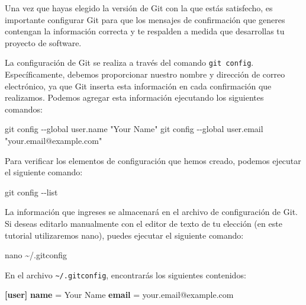 \documentclass[
  letterpaper,
  DIV=11,
  numbers=noendperiod]{scrartcl}
\newenvironment{Shaded}{}{}
\newcommand{\AttributeTok}[1]{\textcolor[rgb]{0.84,0.23,0.29}{#1}}
\newcommand{\ExtensionTok}[1]{\textcolor[rgb]{0.84,0.23,0.29}{\textbf{#1}}}
\newcommand{\FunctionTok}[1]{\textcolor[rgb]{0.44,0.26,0.76}{#1}}
\newcommand{\NormalTok}[1]{\textcolor[rgb]{0.14,0.16,0.18}{#1}}
\newcommand{\StringTok}[1]{\textcolor[rgb]{0.01,0.18,0.38}{#1}}
\begin{document}
Una vez que hayas elegido la versión de Git con la que estás satisfecho,
es importante configurar Git para que los mensajes de confirmación que
generes contengan la información correcta y te respalden a medida que
desarrollas tu proyecto de software.

La configuración de Git se realiza a través del comando
\texttt{git\ config}. Específicamente, debemos proporcionar nuestro
nombre y dirección de correo electrónico, ya que Git inserta esta
información en cada confirmación que realizamos. Podemos agregar esta
información ejecutando los siguientes comandos:

\begin{Shaded}
\begin{Highlighting}[]
\FunctionTok{git}\NormalTok{ config }\AttributeTok{{-}{-}global}\NormalTok{ user.name }\StringTok{"Your Name"}
\FunctionTok{git}\NormalTok{ config }\AttributeTok{{-}{-}global}\NormalTok{ user.email }\StringTok{"your.email@example.com"}
\end{Highlighting}
\end{Shaded}

Para verificar los elementos de configuración que hemos creado, podemos
ejecutar el siguiente comando:

\begin{Shaded}
\begin{Highlighting}[]
\FunctionTok{git}\NormalTok{ config }\AttributeTok{{-}{-}list}
\end{Highlighting}
\end{Shaded}

La información que ingreses se almacenará en el archivo de configuración
de Git. Si deseas editarlo manualmente con el editor de texto de tu
elección (en este tutorial utilizaremos nano), puedes ejecutar el
siguiente comando:

\begin{Shaded}
\begin{Highlighting}[]
\FunctionTok{nano}\NormalTok{ \textasciitilde{}/.gitconfig}
\end{Highlighting}
\end{Shaded}

En el archivo \texttt{\textasciitilde{}/.gitconfig}, encontrarás los
siguientes contenidos:

\begin{Shaded}
\begin{Highlighting}[]
\ExtensionTok{[user]}
    \ExtensionTok{name}\NormalTok{ = Your Name}
    \ExtensionTok{email}\NormalTok{ = your.email@example.com}
\end{Highlighting}
\end{Shaded}
\end{document}
